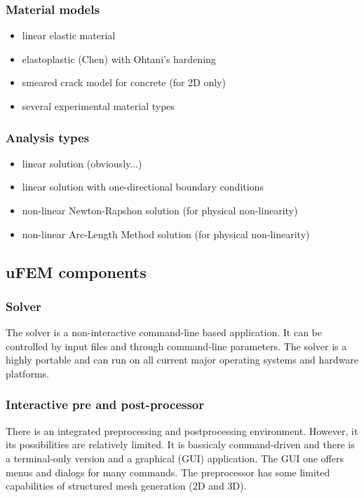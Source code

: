 \documentclass{article}
\begin{document}
\subsubsection{Material models}
\begin{itemize}
\item  linear elastic material
\item  elastoplastic (Chen) with Ohtani's hardening
\item  smeared crack model for concrete (for 2D only)
\item  several experimental material types
\end{itemize}

\subsubsection{Analysis types}
\begin{itemize}
\item  linear solution (obviously...)
\item  linear solution with one-directional boundary conditions
\item  non-linear Newton-Rapshon solution (for physical non-linearity)
\item  non-linear Arc-Length Method solution (for physical non-linearity)
\end{itemize}

\subsection{uFEM components}

\subsubsection{Solver}

 The solver is a non-interactive command-line based application.
 It can be controlled by input files and through command-line
 parameters. The solver is a highly portable and can run on
 all current major operating systems and hardware platforms.



\subsubsection{Interactive pre and post-processor}

 There is an integrated preprocessing and postprocessing 
 environment. However, it its possibilities are relatively limited.
 It is bassicaly command-driven and there is a terminal-only
 version and a graphical (GUI) application. The GUI one
 offers menus and dialogs for many commands.
 The preprocessor has some limited capabilities of structured
 mesh generation (2D and 3D).
\end{document}
